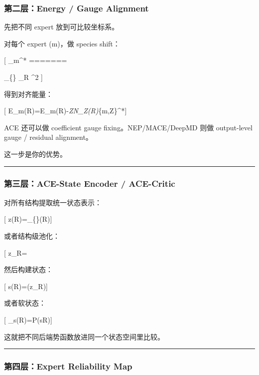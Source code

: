 \documentclass[
  12pt,
]{ctexart}
\begin{document}
\subsubsection{第二层：Energy / Gauge
Alignment}\label{ux7b2cux4e8cux5c42energy-gauge-alignment}

先把不同 expert 放到可比较坐标系。

对每个 expert (m)，做 species shift：

{[} \mu\_m\^{}* =======

\arg\min\_\{\mu\} \sum\_R \^{}2 {]}

得到对齐能量：

{[} \tilde E\_m(R)=E\_m(R)-\sum\emph{ZN\_Z(R)\mu}\{m,Z\}\^{}*{]}

ACE 还可以做 coefficient gauge fixing。NEP/MACE/DeepMD 则做 output-level
gauge / residual alignment。

这一步是你的优势。

\begin{center}\rule{0.5\linewidth}{0.5pt}\end{center}

\subsubsection{第三层：ACE-State Encoder /
ACE-Critic}\label{ux7b2cux4e09ux5c42ace-state-encoder-ace-critic}

对所有结构提取统一状态表示：

{[} z(R)=\Phi\_\{\}(R){]}

或者结构级池化：

{[} z\_R=\mathrm{pool}{\Phi_{\mathrm{ACE}}(q_i)}{]}

然后构建状态：

{[} s(R)=(z\_R){]}

或者软状态：

{[} \gamma\_s(R)=P(s\mid R){]}

这就把不同后端势函数放进同一个状态空间里比较。

\begin{center}\rule{0.5\linewidth}{0.5pt}\end{center}

\subsubsection{第四层：Expert Reliability
Map}\label{ux7b2cux56dbux5c42expert-reliability-map}
\end{document}
